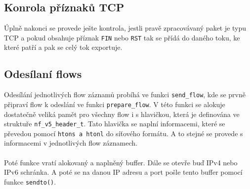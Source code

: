 \documentclass[12pt]{article}
\begin{document}
\subsection*{Konrola příznaků TCP}
Úplně nakonci se provede ješte kontrola, jestli pravě zpracovávaný paket je typu TCP a pokud obsahuje příznak \texttt{FIN} nebo \texttt{RST} tak se přídá do daného toku, ke které patří a pak se celý tok exportuje.
\subsection{Odesílaní flows}
Odesílání jednotlivých flow záznamů probíhá ve funkci \texttt{send\_flow}, kde se prvně připraví flow k odeslání ve funkci \texttt{prepare\_flow}. V této funkci se alokuje dostatečně veliká pamět pro všechny flow i s hlavičkou, která je definována ve struktuře
\texttt{nf\_v5\_header\_t}. Tato hlavička se naplní informacemi, které se převedou pomocí \texttt{htons a htonl} do síťového formátu. A to stejné se provede s informacemi v jednotlivých flow záznamech.
\\\\
Poté funkce vratí alokovaný a naplněný buffer. Dále se otevře buď IPv4 nebo IPv6 schránka. A poté se na danou IP adresu a port pošle tento buffer pomocí funkce \texttt{sendto()}.
\end{document}
